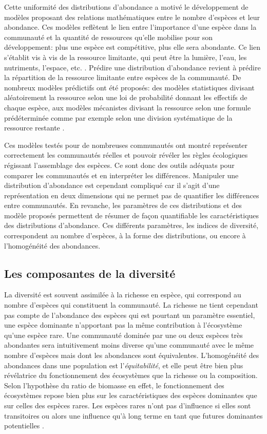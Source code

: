 \documentclass[
  11pt,
  french,
  A4paper,
  extrafontsizes,onecolumn,openright
  ]{memoir}
\begin{document}
Cette uniformité des distributions d'abondance a motivé le développement
de modèles proposant des relations mathématiques entre le nombre
d'espèces et leur abondance. Ces modèles reflètent le lien entre
l'importance d'une espèce dans la communauté et la quantité de
ressources qu'elle mobilise pour son développement: plus une espèce est
compétitive, plus elle sera abondante. Ce lien s'établit vis à vis de la
ressource limitante, qui peut être la lumière, l'eau, les nutriments,
l'espace, etc. \autocites{Silvertown2004}{terSteege2006}. Prédire une
distribution d'abondance revient à prédire la répartition de la
ressource limitante entre espèces de la communauté. De nombreux modèles
prédictifs ont été proposés: des modèles statistiques divisant
aléatoirement la ressource selon une loi de probabilité donnant les
effectifs de chaque espèce, aux modèles mécanistes divisant la ressource
selon une formule prédéterminée comme par exemple selon une division
systématique de la ressource restante
\autocites{Fisher1943}{Motomura1932}{Tokeshi1993}{Magurran1988}.

Ces modèles testés pour de nombreuses communautés ont montré représenter
correctement les communautés réelles et pouvoir révéler les règles
écologiques régissant l'assemblage des espèces. Ce sont donc des outils
adéquats pour comparer les communautés et en interpréter les
différences. Manipuler une distribution d'abondance est cependant
compliqué car il s'agit d'une représentation en deux dimensions qui ne
permet pas de quantifier les différences entre communautés. En revanche,
les paramètres de ces distributions et des modèle proposés permettent de
résumer de façon quantifiable les caractéristiques des distributions
d'abondance. Ces différents paramètres, les indices de diversité,
correspondent au nombre d'espèces, à la forme des distributions, ou
encore à l'homogénéité des abondances.

\subsection{Les composantes de la
diversité}\label{les-composantes-de-la-diversite}

La diversité est souvent assimilée à la richesse en espèce, qui
correspond au nombre d'espèces qui constituent la communauté. La
richesse ne tient cependant pas compte de l'abondance des espèces qui
est pourtant un paramètre essentiel, une espèce dominante n'apportant
pas la même contribution à l'écosystème qu'une espèce rare. Une
communauté dominée par une ou deux espèces très abondantes sera
intuitivement moins diverse qu'une communauté avec le même nombre
d'espèces mais dont les abondances sont équivalentes. L'homogénéité des
abondances dans une population est l'\emph{équitabilité}, et elle peut
être bien plus révélatrice du fonctionnement des écosystèmes que la
richesse ou la composition. Selon l'hypothèse du ratio de biomasse en
effet, le fonctionnement des écosystèmes repose bien plus sur les
caractéristiques des espèces dominantes que sur celles des espèces
rares. Les espèces rares n'ont pas d'influence si elles sont
transitoires ou alors une influence qu'à long terme en tant que futures
dominantes potentielles \autocite{Grime1998}.
\end{document}
